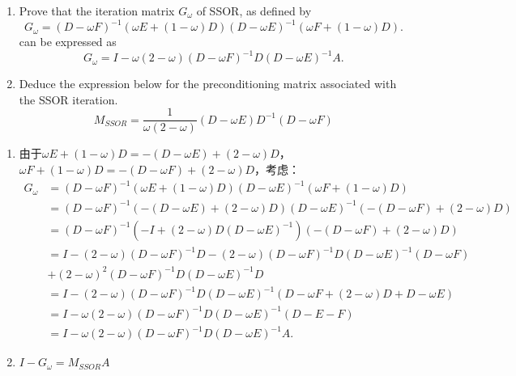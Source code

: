 \documentclass{ctexart}
\newif\ifpreface
\begin{document}
\large
\setlength{\baselineskip}{1.2em}
\ifpreface
    
\newgeometry{left=2cm,right=2cm,top=2cm,bottom=2cm}
\else
{}
\maketitle
\fi

\begin{problem} 
  \begin{enumerate}
    \item Prove that the iteration matrix \( G_{\omega} \) of SSOR, as defined by 
  \[
G_{\omega} = (D - \omega F)^{-1} (\omega E + (1 - \omega) D)
              (D - \omega E)^{-1} (\omega F + (1 - \omega) D).
  \]
  can be expressed as  
\[
G_{\omega} = I - \omega(2 - \omega)(D - \omega F)^{-1} D (D - \omega E)^{-1} A.
\]
\item Deduce the expression below for the preconditioning matrix associated with the SSOR iteration.
  \[
M_{SSOR} = \frac{1}{\omega (2 - \omega)} (D - \omega E) D^{-1} (D - \omega F)
\]
  \end{enumerate}
  
\end{problem}
\begin{solution}
  \begin{enumerate}
    \item 由于\(\omega E + (1-\omega )D = -(D-\omega E)+ (2-\omega )D \)，\(\omega F + (1-\omega )D = -(D-\omega F)+ (2-\omega )D  \)，考虑：
  \[
    \begin{aligned}
      G_{\omega}&=(D- \omega F)^{-1}(\omega E + (1-\omega )D)(D -\omega E)^{-1}(\omega F + (1-\omega)D)\\ 
      &=(D- \omega F)^{-1}(-(D-\omega E)+ (2-\omega )D )(D -\omega E)^{-1}(-(D-\omega F)+ (2-\omega )D)\\ 
      &=(D- \omega F)^{-1}(-I+ (2-\omega )D (D -\omega E)^{-1})(-(D-\omega F)+ (2-\omega )D)\\ 
      &=I -(2-\omega)(D-\omega F)^{-1}D -(2-\omega)(D-\omega F)^{-1}D(D-\omega E)^{-1}(D-\omega F)\\ 
      &+ (2-\omega )^2(D-\omega F)^{-1}D(D-\omega E)^{-1}D\\ 
      &=I - (2-\omega)(D-\omega F)^{-1}D(D-\omega E)^{-1}(D-\omega F + (2-\omega)D + D - \omega E )\\ 
      &=I - \omega (2-\omega)(D-\omega F)^{-1}D(D-\omega E)^{-1}(D-E-F)\\
      &=I - \omega(2 - \omega)(D - \omega F)^{-1} D (D - \omega E)^{-1} A.
    \end{aligned}
  \]
\item \(I-G_{\omega}=M_{SSOR}A \) 
  \end{enumerate}
\end{solution}
\end{document}

